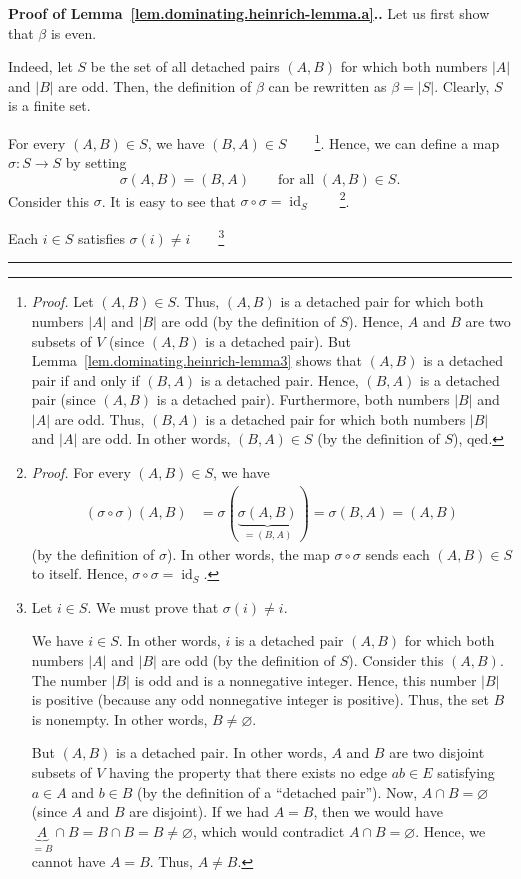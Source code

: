 \documentclass[numbers=enddot,12pt,final,onecolumn,notitlepage]{scrartcl}%
\theoremstyle{definition}
\newenvironment{proof}[1][Proof]{\noindent\textbf{#1.} }{\ \rule{0.5em}{0.5em}}
\newcommand{\id}{\operatorname{id}}
\newcommand{\abs}[1]{\left| #1 \right|}
\newcommand{\tup}[1]{\left( #1 \right)}
\begin{document}
\begin{proof}[Proof of Lemma~\ref{lem.dominating.heinrich-lemma.a}.]
Let us first show that $\beta$ is even.

Indeed, let $S$ be the set of all detached pairs $\tup{A, B}$ for
which both numbers $\abs{A}$ and $\abs{B}$ are odd.
Then, the definition of $\beta$ can be rewritten as
$\beta = \abs{S}$. Clearly, $S$ is a finite set.

For every $\tup{A, B} \in S$, we have
$\tup{B, A} \in S$\ \ \ \ \footnote{\textit{Proof.} Let
$\tup{A, B} \in S$. Thus, $\tup{A, B}$ is a detached pair for which
both numbers $\abs{A}$ and $\abs{B}$ are odd (by the definition of
$S$). Hence, $A$ and $B$ are two subsets of $V$ (since $\tup{A, B}$ is
a detached pair).
But Lemma~\ref{lem.dominating.heinrich-lemma3} shows that $\tup{A, B}$
is a detached pair if and only if $\tup{B, A}$ is a detached pair.
Hence, $\tup{B, A}$ is a detached pair (since $\tup{A, B}$ is a
detached pair). Furthermore, both numbers $\abs{B}$ and $\abs{A}$ are
odd. Thus, $\tup{B, A}$ is a detached pair for which both numbers
$\abs{B}$ and $\abs{A}$ are odd. In other words, $\tup{B, A} \in S$
(by the definition of $S$), qed.}. Hence, we can define a map
$\sigma : S \to S$ by setting
\[
\sigma\tup{A, B} = \tup{B, A}
\qquad \text{for all } \tup{A, B} \in S .
\]
Consider this $\sigma$. It is easy to see that
$\sigma \circ \sigma = \id_S$\ \ \ \ \footnote{\textit{Proof.}
For every $\tup{A, B} \in S$, we have
\begin{align*}
\tup{\sigma \circ \sigma} \tup{A, B}
&= \sigma \tup{\underbrace{\sigma \tup{A, B}}_{= \tup{B, A}}}
= \sigma \tup{B, A} = \tup{A, B}
\end{align*}
(by the definition of $\sigma$). In other words, the map
$\sigma \circ \sigma$ sends each $\tup{A, B} \in S$ to itself. Hence,
$\sigma \circ \sigma = \id_S$.}.

Each $i \in S$ satisfies
$\sigma\tup{i} \neq i$\ \ \ \ \footnote{
Let $i \in S$. We must prove that $\sigma\tup{i} \neq i$.

We have $i \in S$.
In other words, $i$ is a detached pair $\tup{A, B}$ for
which both numbers $\abs{A}$ and $\abs{B}$ are odd (by the
definition of $S$). Consider
this $\tup{A, B}$. The number $\abs{B}$ is odd and is a nonnegative
integer. Hence, this number $\abs{B}$ is positive (because any odd
nonnegative integer is positive). Thus, the set
$B$ is nonempty. In other words, $B \neq \varnothing$.

But $\tup{A, B}$ is a detached pair. In other
words, $A$ and $B$ are two disjoint subsets of $V$ having the
property that there exists no edge $ab \in E$ satisfying $a \in A$
and $b \in B$ (by the definition of a ``detached pair'').
Now, $A \cap B = \varnothing$ (since $A$ and $B$ are disjoint).
If we had $A = B$, then we would have
$\underbrace{A}_{=B} \cap B = B \cap B = B \neq \varnothing$,
which would contradict $A \cap B = \varnothing$. Hence, we cannot
have $A = B$. Thus, $A \neq B$.

}
\end{proof}
\end{document}
